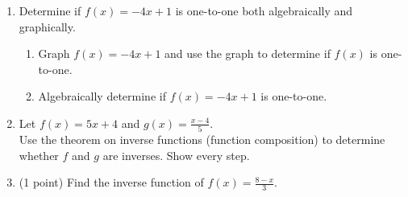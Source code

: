 



\begin{enumerate}

\item  Determine if $f(x)=-4x+1$ is one-to-one both algebraically and graphically.
\begin{enumerate}

\item  Graph $f(x)=-4x+1$ and use the graph to determine if $f(x)$ is one-to-one.




\item  Algebraically determine if $f(x)=-4x+1$ is one-to-one.

\vfill


\end{enumerate}



\vfill
\newpage

\item   Let $f(x)=5x+4$ and $\displaystyle g(x)=\frac{x-4}{5}$.\\
Use the theorem on inverse functions (function composition) to determine whether $f$ and $g$ are inverses.  Show every step.
\vfill


\item (1 point) Find the inverse function of $\displaystyle f(x)=\frac{8-x}{3}$.
\vfill




\end{enumerate}



